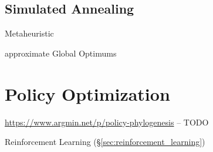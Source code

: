 \subsection{Simulated Annealing}\label{sec:simulated_annealing}

Metaheuristic

approximate Global Optimums



\section{Policy Optimization}\label{sec:policy_optimization}


\url{https://www.argmin.net/p/policy-phylogenesis} -- TODO

Reinforcement Learning (\S\ref{sec:reinforcement_learning})
